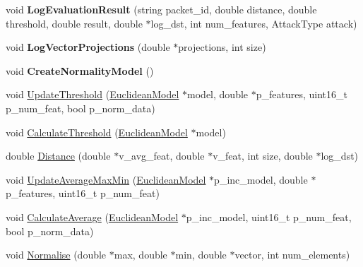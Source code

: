 \begin{DoxyCompactItemize}
\item 
\hypertarget{classns3_1_1DetectorEuclidean_a47b22c0b1663abc16f32c0685c856b69}{}void {\bfseries Log\+Evaluation\+Result} (string packet\+\_\+id, double distance, double threshold, double result, double $\ast$log\+\_\+dst, int num\+\_\+features, Attack\+Type attack)\label{classns3_1_1DetectorEuclidean_a47b22c0b1663abc16f32c0685c856b69}

\item 
\hypertarget{classns3_1_1DetectorEuclidean_ad95384506a0aeee28db09c4350257b4d}{}void {\bfseries Log\+Vector\+Projections} (double $\ast$projections, int size)\label{classns3_1_1DetectorEuclidean_ad95384506a0aeee28db09c4350257b4d}

\item 
\hypertarget{classns3_1_1DetectorEuclidean_aa5844006d7a0e999b3b5bddd2eb2441e}{}void {\bfseries Create\+Normality\+Model} ()\label{classns3_1_1DetectorEuclidean_aa5844006d7a0e999b3b5bddd2eb2441e}

\item 
void \hyperlink{classns3_1_1DetectorEuclidean_abe46639e2bfc51645b6b5ee7bfb5803d}{Update\+Threshold} (\hyperlink{classns3_1_1EuclideanModel}{Euclidean\+Model} $\ast$model, double $\ast$p\+\_\+features, uint16\+\_\+t p\+\_\+num\+\_\+feat, bool p\+\_\+norm\+\_\+data)
\item 
void \hyperlink{classns3_1_1DetectorEuclidean_acff00214e0871307be11fe1371057039}{Calculate\+Threshold} (\hyperlink{classns3_1_1EuclideanModel}{Euclidean\+Model} $\ast$model)
\item 
double \hyperlink{classns3_1_1DetectorEuclidean_a4d37d16d244e69ee9605264126fc3742}{Distance} (double $\ast$v\+\_\+avg\+\_\+feat, double $\ast$v\+\_\+feat, int size, double $\ast$log\+\_\+dst)
\item 
void \hyperlink{classns3_1_1DetectorEuclidean_ad5fa9f27f2947e221f9c40954e91fb31}{Update\+Average\+Max\+Min} (\hyperlink{classns3_1_1EuclideanModel}{Euclidean\+Model} $\ast$p\+\_\+inc\+\_\+model, double $\ast$p\+\_\+features, uint16\+\_\+t p\+\_\+num\+\_\+feat)
\item 
void \hyperlink{classns3_1_1DetectorEuclidean_a6f22d2df3e7896d186e7e7dd5082dfea}{Calculate\+Average} (\hyperlink{classns3_1_1EuclideanModel}{Euclidean\+Model} $\ast$p\+\_\+inc\+\_\+model, uint16\+\_\+t p\+\_\+num\+\_\+feat, bool p\+\_\+norm\+\_\+data)
\item 
void \hyperlink{classns3_1_1DetectorEuclidean_a43834b3c69f2ff7da32e68a5dde0cff5}{Normalise} (double $\ast$max, double $\ast$min, double $\ast$vector, int num\+\_\+elements)
\end{DoxyCompactItemize}
